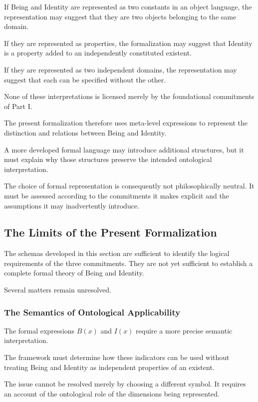 If Being and Identity are represented
as two constants in an object language,
the representation may suggest that
they are two objects belonging to
the same domain.

If they are represented as properties,
the formalization may suggest that
Identity is a property added to
an independently constituted existent.

If they are represented as two
independent domains, the representation
may suggest that each can be specified
without the other.

None of these interpretations is
licensed merely by the foundational
commitments of Part I.

The present formalization therefore
uses meta-level expressions to
represent the distinction and
relations between Being and Identity.

A more developed formal language
may introduce additional structures,
but it must explain why those
structures preserve the intended
ontological interpretation.

The choice of formal representation
is consequently not philosophically
neutral. It must be assessed according
to the commitments it makes explicit
and the assumptions it may inadvertently
introduce.

\subsection{The Limits of the Present Formalization}

The schemas developed in this section
are sufficient to identify the logical
requirements of the three commitments.
They are not yet sufficient to establish
a complete formal theory of Being and
Identity.

Several matters remain unresolved.

\subsubsection{The Semantics of Ontological Applicability}

The formal expressions \(B(x)\) and
\(I(x)\) require a more precise semantic
interpretation.

The framework must determine how
these indicators can be used without
treating Being and Identity as
independent properties of an existent.

The issue cannot be resolved merely
by choosing a different symbol.
It requires an account of the
ontological role of the dimensions
being represented.

